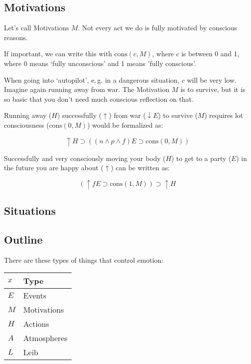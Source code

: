 \documentclass{scrartcl}
\begin{document}
\subsection{Motivations}

Let's call Motivations $M$. Not every act we do is fully motivated by conscious reasons. 

If important, we can write this with $\textrm{cons}(c, M)$, where $c$ is between 0 and 1, where
0 means `fully unconscious' and 1 means 'fully conscious'.

When going into `autopilot', e.\,g. in a dangerous situation, $c$ will be very low. Imagine again running
away from war. The Motivation $M$ is to survive, but it is so basic that you don't need much conscious reflection
on that.

Running away ($H$) successfully ($\uparrow$) from war ($\downarrow E$) to survive ($M$) requires lot consciousness ($\textrm{cons}(0, M)$) would be formalized as:

\begin{equation} 
	\uparrow H \supset\left(
		\left(n\wedge p\wedge f\right)E \supset \textrm{cons}(0, M)
	\right)
\end{equation}

Successfully and very consciously moving your body ($H$) to get to a party ($E$) in the future you are happy about ($\uparrow$) can be written as:

\begin{equation}
	\left(
		\uparrow f E \supset \textrm{cons}(1, M)
	\right)
	\supset \uparrow H 
\end{equation}

\subsection{Situations}

\subsection{Outline}

There are these types of things that control emotion:

\begin{tabular}{l|l}
	$x$ & Type \\ \hline
	$E$ & Events \\
	$M$ & Motivations \\
	$H$ & Actions \\
	$A$ & Atmospheres \\
	$L$ & Leib
\end{tabular}
\end{document}
